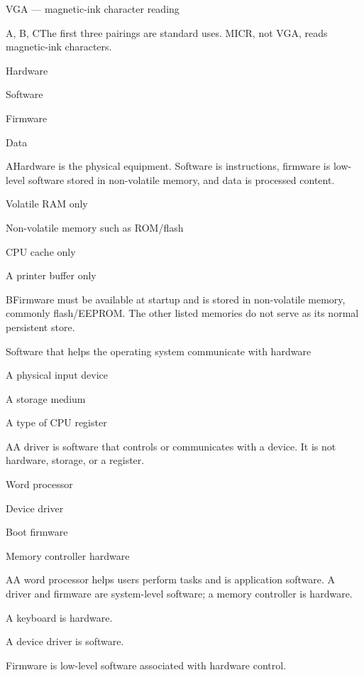 \begin{enumerate}[label=\textbf{Q\arabic*.}, leftmargin=*]
{   \item VGA --- magnetic-ink character reading}
  {A, B, C}{The first three pairings are standard uses. MICR, not VGA, reads magnetic-ink characters.}
\fi
\ifnum{}
  {\item Hardware
   \item Software
   \item Firmware
   \item Data}
  {A}{Hardware is the physical equipment. Software is instructions, firmware is low-level software stored in non-volatile memory, and data is processed content.}
  {\item Volatile RAM only
   \item Non-volatile memory such as ROM/flash
   \item CPU cache only
   \item A printer buffer only}
  {B}{Firmware must be available at startup and is stored in non-volatile memory, commonly flash/EEPROM. The other listed memories do not serve as its normal persistent store.}
  {\item Software that helps the operating system communicate with hardware
   \item A physical input device
   \item A storage medium
   \item A type of CPU register}
  {A}{A driver is software that controls or communicates with a device. It is not hardware, storage, or a register.}
  {\item Word processor
   \item Device driver
   \item Boot firmware
   \item Memory controller hardware}
  {A}{A word processor helps users perform tasks and is application software. A driver and firmware are system-level software; a memory controller is hardware.}
  {\item A keyboard is hardware.
   \item A device driver is software.
   \item Firmware is low-level software associated with hardware control.
}
\end{enumerate}
